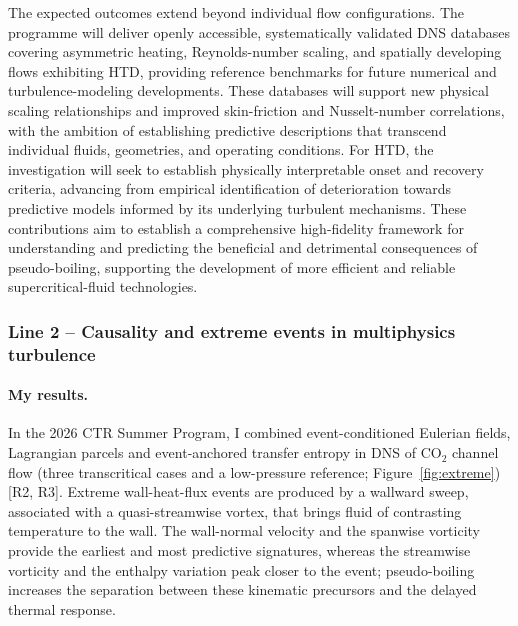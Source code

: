 \documentclass[11pt]{article}
\begin{document}
The expected outcomes extend beyond individual flow configurations.
The programme will deliver openly accessible, systematically validated DNS databases covering asymmetric heating, Reynolds-number scaling, and spatially developing flows exhibiting HTD, providing reference benchmarks for future numerical and turbulence-modeling developments.
These databases will support new physical scaling relationships and improved skin-friction and Nusselt-number correlations, with the ambition of establishing predictive descriptions that transcend individual fluids, geometries, and operating conditions.
For HTD, the investigation will seek to establish physically interpretable onset and recovery criteria, advancing from empirical identification of deterioration towards predictive models informed by its underlying turbulent mechanisms.
These contributions aim to establish a comprehensive high-fidelity framework for understanding and predicting the beneficial and detrimental consequences of pseudo-boiling, supporting the development of more efficient and reliable supercritical-fluid technologies.

\subsubsection*{Line 2 -- Causality and extreme events in multiphysics turbulence}

\paragraph{My results.} In the 2026 CTR Summer Program, I combined event-conditioned Eulerian
fields, Lagrangian parcels and event-anchored transfer entropy in DNS of CO$_2$ channel flow
(three transcritical cases and a low-pressure reference; Figure~\ref{fig:extreme}) [R2, R3].
Extreme wall-heat-flux events are produced by a wallward sweep, associated with a
quasi-streamwise vortex, that brings fluid of contrasting temperature to the wall. The
wall-normal velocity and the spanwise vorticity provide the earliest and most predictive
signatures, whereas the streamwise vorticity and the enthalpy variation peak closer to the event;
pseudo-boiling increases the separation between these kinematic precursors and the delayed
thermal response.
\end{document}
